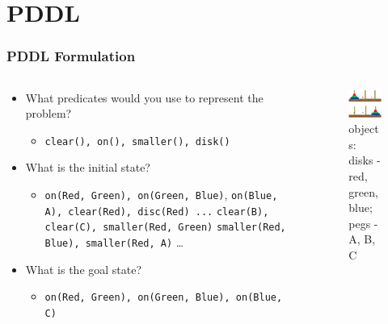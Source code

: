 \documentclass[compress, 9pt]{beamer}
\begin{document}
\section{PDDL}
\label{sec-2}
\begin{frame}
\frametitle{PDDL Formulation}
\label{sec-2-1}
\begin{columns}
\begin{column}{0.5\textwidth}
\label{sec-2-1-1}

\begin{itemize}
\item <1-> What predicates would you use to represent the problem?
\begin{itemize}
\item <2-> \texttt{clear(), on(), smaller(), disk()}
\end{itemize}
\item <3-> What is the initial state?
\begin{itemize}
\item <4-> \texttt{on(Red, Green), on(Green, Blue)},
         \texttt{on(Blue, A), clear(Red), disc(Red) ...}
         \texttt{clear(B), clear(C), smaller(Red, Green)} 
         \texttt{smaller(Red, Blue), smaller(Red, A)} \ldots{}
\end{itemize}
\item <5-> What is the goal state?
\begin{itemize}
\item <6-> \texttt{on(Red, Green), on(Green, Blue), on(Blue, C)}
\end{itemize}
\end{itemize}
\end{column}
\begin{column}{0.5\textwidth}
\label{sec-2-1-2}

 \begin{figure}[htb]
 \centering
 \includegraphics[width=5cm]{../images/torrehanoi.png}
 \caption{objects: disks - red, green, blue; pegs - A, B, C}
 \end{figure}
\end{column}
\end{columns}
\label{sec-2-1-3}


\end{frame}
\end{document}
